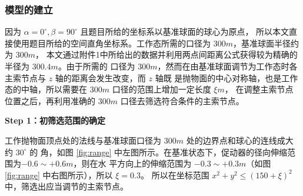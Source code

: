 \documentclass[withoutpreface,bwprint]{cumcmthesis} %
\begin{document}
\subsubsection{模型的建立}
因为 $\alpha = 0^\circ ,\beta = 90^\circ$ 且题目所给的坐标系以基准球面的球心为原点，
所以本文直接使用题目所给的空间直角坐标系。工作态所需的口径为 $300m$，基准球面半径约为 $300m$，
本文通过附件1中所给出的数据并利用两点间距离公式获得较为精确的半径为 $300.4m$。由于所需的
口径为 $300m$，然而在由基准球面调节为工作态时各主索节点与 $z$ 轴的距离会发生改变，而 $z$ 轴既
是抛物面的中心对称轴，也是工作态的中轴，所以需要在 $300m$ 口径的范围上增加一定长度 $\xi m$，
在调整主索节点位置之后，再利用准确的 $300m$ 口径去筛选符合条件的主索节点。

\textbf{Step 1：初筛选范围的确定}

工作抛物面顶点处的法线与基准球面口径为 $300m$ 处的边界点和球心的连线成大约 $30^\circ$ 的
角，如图 \ref{fig:range} 中左图所示。在基准状态下，促动器的径向伸缩范围为$-0.6\sim +0.6m$，则在水
平方向上的伸缩范围为 $-0.3\sim +0.3m$（如图 \ref{fig:range} 中右图所示），所以 $\xi = 0.3$。
所以在坐标范围 $x^2 + y^2 \leqslant (150 + \xi)^2$ 中，筛选出应当调节的主索节点。
\end{document}

